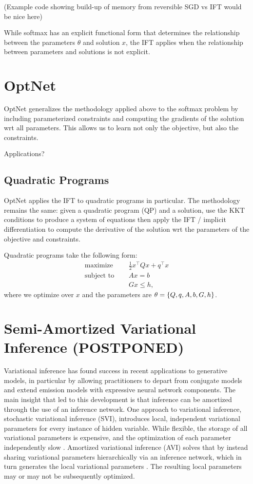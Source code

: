 \documentclass[11pt]{article}
\begin{document}
(Example code showing build-up of memory from reversible SGD vs IFT would be nice here)

While softmax has an explicit functional form that determines the relationship between
the parameters $\theta$ and solution $x$, the IFT applies when
the relationship between parameters and solutions is not explicit.

\section{OptNet}
OptNet generalizes the methodology applied above to the softmax problem by
including parameterized constraints and computing the gradients of the solution
wrt all parameters.
This allows us to learn not only the objective, but also the constraints.

Applications?

\subsection{Quadratic Programs}
OptNet applies the IFT to quadratic programs in particular.
The methodology remains the same: given a quadratic program (QP) and a solution,
use the KKT conditions to produce a system of equations then apply the IFT
/ implicit differentiation to compute the derivative of the solution wrt the
parameters of the objective and constraints.

Quadratic programs take the following form:
\begin{equation}
\label{eqn:qp}
\begin{aligned}
\textrm{maximize } \quad & \frac12 x^\top Q x + q^\top x\\
\textrm{subject to } \quad & Ax = b\\
& Gx \leq h,
\end{aligned}
\end{equation}
where we optimize over $x$ and the parameters are $\theta = \left\{Q, q, A, b, G, h\right\}$.

\section{Semi-Amortized Variational Inference (POSTPONED)}
Variational inference has found success in recent applications to generative models,
in particular by allowing practitioners to depart from conjugate models
and extend emission models with expressive neural network components.
The main insight that led to this development is that inference can be amortized through
the use of an inference network.
One approach to variational inference, stochastic variational inference (SVI),
introduces local, independent variational parameters for every instance of hidden variable.
While flexible, the storage of all variational parameters is expensive, and the optimization
of each parameter independently slow \citep{}.
Amortized variational inference (AVI) solves that by instead sharing variational parameters hierarchically
via an inference network, which in turn generates the local variational parameters \citep{}.
The resulting local parameters may or may not be subsequently optimized.
\end{document}
